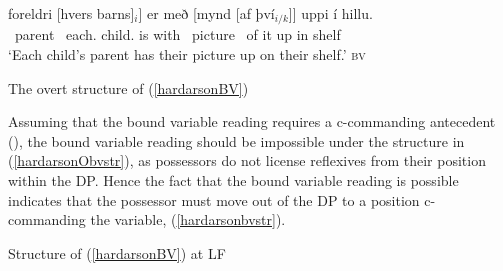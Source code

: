 \documentclass[output=paper,colorlinks,citecolor=brown,
]{langscibook}
\begin{document}
\begin{exe}
	\ex	\gll {[}foreldri [hvers barns]$_i$] er með [mynd [af því$_{i/k}$]] uppi í hillu. \label{hardarsonBV}\\
			~parent ~each.{\hardGen} child.{\hardGen} is with ~picture ~of it up in shelf\\
		\glt	`Each child's parent has their picture up on their shelf.' \hfill \textsc{bv}
\end{exe}

 

\begin{exe}
    \ex The overt structure of (\ref{hardarsonBV}) \label{hardarsonObvstr}\\
\end{exe}

\noindent Assuming that the bound variable reading requires a c-commanding antecedent (\citealt{Reinhart:1983vx}), the bound variable reading should be impossible under the structure in (\ref{hardarsonObvstr}), as possessors do not license reflexives from their position within the DP. Hence the fact that the bound variable reading is possible indicates that the possessor must move out of the DP to a position c-commanding the variable, (\ref{hardarsonbvstr}).

\begin{exe}
	\ex	Structure of (\ref{hardarsonBV}) at LF \label{hardarsonbvstr}\\
\end{exe}
\end{document}
